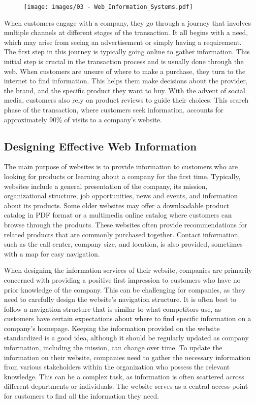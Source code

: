 \begin{figure}[!h]
  \centering
  \texttt{[image: images/03 - Web\_Information\_Systems.pdf]}
\end{figure}

When customers engage with a company, they go through a journey that
involves multiple channels at different stages of the transaction. It
all begins with a need, which may arise from seeing an advertisement or
simply having a requirement. The first step in this journey is typically
going online to gather information. This initial step is crucial in the
transaction process and is usually done through the web. When customers
are unsure of where to make a purchase, they turn to the internet to
find information. This helps them make decisions about the provider, the
brand, and the specific product they want to buy. With the advent of
social media, customers also rely on product reviews to guide their
choices. This search phase of the transaction, where customers seek
information, accounts for approximately 90\% of visits to a company's
website.

\subsection{Designing Effective Web
  Information}\label{designing-effective-web-information}

The main purpose of websites is to provide information to customers who
are looking for products or learning about a company for the first time.
Typically, websites include a general presentation of the company, its
mission, organizational structure, job opportunities, news and events,
and information about its products. Some older websites may offer a
downloadable product catalog in PDF format or a multimedia online
catalog where customers can browse through the products. These websites
often provide recommendations for related products that are commonly
purchased together. Contact information, such as the call center,
company size, and location, is also provided, sometimes with a map for
easy navigation.

When designing the information services of their website, companies are
primarily concerned with providing a positive first impression to
customers who have no prior knowledge of the company. This can be
challenging for companies, as they need to carefully design the
website's navigation structure. It is often best to follow a navigation
structure that is similar to what competitors use, as customers have
certain expectations about where to find specific information on a
company's homepage. Keeping the information provided on the website
standardized is a good idea, although it should be regularly updated as
company information, including the mission, can change over time. To
update the information on their website, companies need to gather the
necessary information from various stakeholders within the organization
who possess the relevant knowledge. This can be a complex task, as
information is often scattered across different departments or
individuals. The website serves as a central access point for customers
to find all the information they need.

